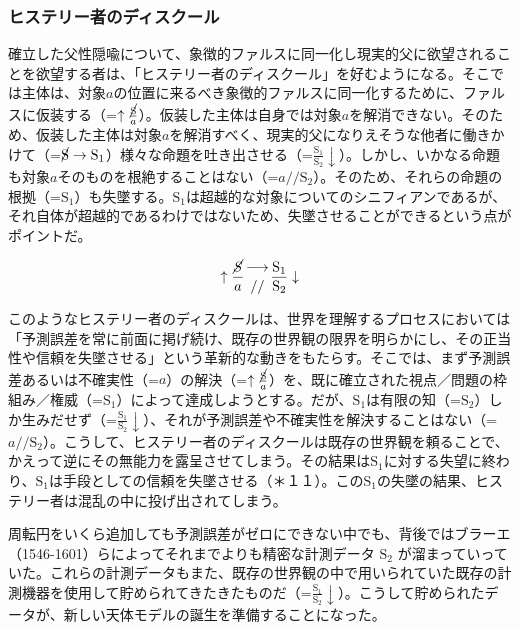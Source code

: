 \subsubsection{ヒステリー者のディスクール}\label{ux30d2ux30b9ux30c6ux30eaux30fcux8005ux306eux30c7ux30a3ux30b9ux30afux30fcux30eb}

確立した父性隠喩について、象徴的ファルスに同一化し現実的父に欲望されることを欲望する者は、「ヒステリー者のディスクール」を好むようになる。そこでは主体は、対象\(a\)の位置に来るべき象徴的ファルスに同一化するために、ファルスに仮装する（=\(\uparrow\frac{\cancel{\textrm{S}}}{a}\)）。仮装した主体は自身では対象\(a\)を解消できない。そのため、仮装した主体は対象\(a\)を解消すべく、現実的父になりえそうな他者に働きかけて（=\(\cancel{\textrm{S}}\rightarrow\textrm{S}_1\)）様々な命題を吐き出させる（=\(\frac{\textrm{S}_1}{\textrm{S}_2}\downarrow\)）。しかし、いかなる命題も対象\(a\)そのものを根絶することはない（=\(a//\textrm{S}_2\)）。そのため、それらの命題の根拠（=\(\textrm{S}_1\)）も失墜する。\(\textrm{S}_1\)は超越的な対象についてのシニフィアンであるが、それ自体が超越的であるわけではないため、失墜させることができるという点がポイントだ。

\[
\uparrow\frac{\mathrm{\cancel{S}}}{a}\genfrac{}{}{0pt}{}{\longrightarrow}{//}\frac{\mathrm{S_1}}{\mathrm{S_2}}\downarrow
\]

このようなヒステリー者のディスクールは、世界を理解するプロセスにおいては「予測誤差を常に前面に掲げ続け、既存の世界観の限界を明らかにし、その正当性や信頼を失墜させる」という革新的な動きをもたらす。そこでは、まず予測誤差あるいは不確実性（=\(a\)）の解決（=\(\uparrow\frac{\cancel{\textrm{S}}}{a}\)）を、既に確立された視点／問題の枠組み／権威（=\(\textrm{S}_1\)）によって達成しようとする。だが、\(\textrm{S}_1\)は有限の知（=\(\textrm{S}_2\)）しか生みだせず（=\(\frac{\textrm{S}_1}{\textrm{S}_2}\downarrow\)）、それが予測誤差や不確実性を解決することはない（=\(a//\textrm{S}_2\)）。こうして、ヒステリー者のディスクールは既存の世界観を頼ることで、かえって逆にその無能力を露呈させてしまう。その結果は\(\textrm{S}_1\)に対する失望に終わり、\(\textrm{S}_1\)は手段としての信頼を失墜させる（＊１１）。この\(\textrm{S}_1\)の失墜の結果、ヒステリー者は混乱の中に投げ出されてしまう。

周転円をいくら追加しても予測誤差がゼロにできない中でも、背後ではブラーエ（1546-1601）らによってそれまでよりも精密な計測データ
\(\textrm{S}_2\)
が溜まっていっていた。これらの計測データもまた、既存の世界観の中で用いられていた既存の計測機器を使用して貯められてきたきたものだ（=\(\frac{\textrm{S}_1}{\textrm{S}_2}\downarrow\)）。こうして貯められたデータが、新しい天体モデルの誕生を準備することになった。

